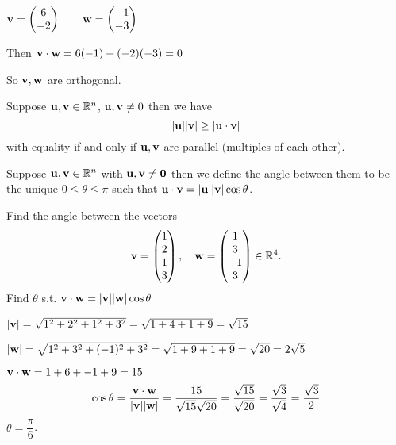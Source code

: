\documentclass[10pt, a4paper]{article}
\begin{document}
\begin{example}
    $\mathbf{v} = \begin{pmatrix}
        6 \\
        -2
    \end{pmatrix}\qquad
    \mathbf{w} = \begin{pmatrix}
        -1 \\
        -3
    \end{pmatrix}$

    Then $\mathbf{v\cdot w} = 6(-1) + (-2)(-3) = 0$

    So $\mathbf{v, w}$ are orthogonal.
\end{example}


\begin{theorem}
    Suppose $\mathbf{u, v} \in \mathbb{R} ^ n$, $\mathbf{u, v} \neq 0$ then we have
    \[
    |\mathbf{u}||\mathbf{v}| \geq |\mathbf{u \cdot v}|
    \]
    with equality if and only if $\mathbf{u, v}$ are parallel (multiples of each other).
\end{theorem}

\begin{definition}
    Suppose $\mathbf{u, v} \in \mathbb{R} ^ n$ with $\mathbf{u, v \neq 0}$ then we define the angle between them to be the unique $0 \leq \theta \leq \pi$ such that $\mathbf{u \cdot v} = |\mathbf{u}||\mathbf{v}|\cos\theta$.
\end{definition}

\begin{example}
    Find the angle between the vectors 
    \[
    \mathbf{v} = \begin{pmatrix}
        1 \\ 2 \\ 1 \\ 3
    \end{pmatrix}, \quad \mathbf{w} = \begin{pmatrix}
        1 \\ 3 \\ -1 \\ 3
    \end{pmatrix} \in \mathbb{R} ^ 4.
    \]
    Find $\theta$ s.t. $\mathbf{v\cdot w} = |\mathbf{v}||\mathbf{w}|\cos\theta$

    $|\mathbf{v}| = \sqrt{1 ^ 2 + 2 ^ 2 + 1 ^ 2 + 3 ^ 2} = \sqrt{1 + 4 + 1 + 9} = \sqrt{15}$
    
    $|\mathbf{w}| = \sqrt{1 ^ 2 + 3 ^ 2 + (-1) ^ 2 + 3 ^ 2} = \sqrt{1 + 9 + 1 + 9} = \sqrt{20} = 2\sqrt{5}$

    $\mathbf{v \cdot w} = 1 + 6 + -1 + 9 = 15$
    \[
    \cos\theta = \frac{\mathbf{v \cdot w}}{|\mathbf{v}||\mathbf{w}|} = \frac{15}{\sqrt{15}\sqrt{20}} = \frac{\sqrt{15}}{\sqrt{20}} = \frac{\sqrt{3}}{\sqrt{4}} = \frac{\sqrt{3}}{2}
    \]
    $\theta = \dfrac{\pi}{6}$.
\end{example}
\end{document}
